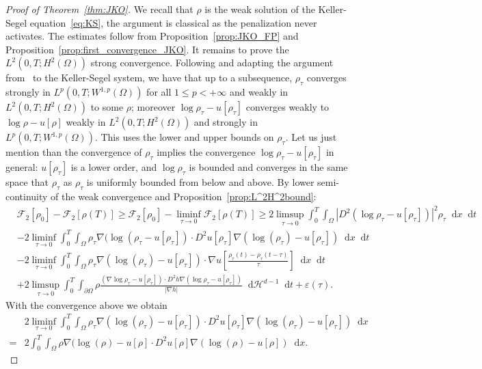 \documentclass[a4paper,twosided, 11pt]{article}
\renewcommand{\color}[2][]{}
\newcommand{\eps}{\varepsilon}
\newcommand {\f}   {\frac}
\newcommand {\p}   {\partial}
\theoremstyle{plain}
\theoremstyle{remark}
\newcommand{\diff}{\mathop{}\!\mathrm{d}}
\numberwithin{equation}{section}
\begin{document}
\begin{proof}[Proof of Theorem~\ref{thm:JKO}]
{\color{blue}We recall that $\rho$ is the weak solution of the Keller-Segel equation~\eqref{eq:KS}, the argument is classical as the penalization never activates. The estimates follow from Proposition~\ref{prop:JKO_FP} and Proposition~\ref{prop:first_convergence_JKO}. It remains to prove the $L^{2}(0,T; H^{2}(\Omega))$ strong convergence. Following and adapting the argument from~\cite[Theorem 6.5]{toshpulatov} to the Keller-Segel system, we have that up to a subsequence, $\rho_{\tau}$ converges strongly in $L^{p}(0,T; W^{1,p}(\Omega))$ for all $1\le p<+\infty$ and weakly in $L^{2}(0,T; H^{2}(\Omega))$ to some $\rho$; moreover $\log \rho_{\tau} -u[\rho_{\tau}]$ converges weakly to $\log \rho - u[\rho]$ weakly in $L^{2}(0,T; H^{2}(\Omega))$ and strongly in $L^{p}(0,T; W^{1,p}(\Omega))$. This uses the lower and upper bounds on $\rho_\tau$. Let us just mention than the convergence of $\rho_\tau$ implies the convergence $\log\rho_\tau - u[\rho_\tau]$ in general: $u[\rho_\tau]$ is a lower order, and $\log\rho_\tau$ is bounded and converges in the same space that $\rho_\tau$ as $\rho_\tau$ is uniformly bounded from below and above.}  By lower semi-continuity of the weak convergence and Proposition~\ref{prop:L^2H^2bound}:
\begin{align*}
 &\mathcal{F}_{2}[\rho_{0}] -  \mathcal{F}_{2}[\rho(T)]\ge \mathcal{F}_{2}[\rho_{0}] -  \liminf_{\tau\to 0}\mathcal{F}_{2}[\rho(T)] \ge 2\limsup_{\tau\to 0}\int_{0}^{T}\int_{\Omega} |D^{2}(\log \rho_{\tau}-u[\rho_{\tau}])|^2\rho_{\tau}\diff x \diff t \\
 &- 2\liminf_{\tau\to 0} \int_{0}^{T}\int_{\Omega}\rho_{\tau} \nabla(\log(\rho_{\tau} -u[\rho_{\tau}])\cdot D^{2}u[\rho_{\tau}]\nabla(\log(\rho_{\tau})-u[\rho_{\tau}])\diff x\diff t\\
 & - 2\liminf_{\tau\to 0} \int_{0}^{T}\int_{\Omega}\rho_{\tau}\nabla\left(\log(\rho_{\tau})-u[\rho_{\tau}]\right)\cdot \nabla u\left[\f{\rho_{\tau}(t)-\rho_{\tau}(t-\tau)}{\tau}\right]\diff x\diff t\\
 & +2\limsup_{\tau\to 0}\int_{0}^{T}\int_{\p\Omega}\rho \f{(\nabla \log \rho_{\tau}-u[\rho_{\tau}])\cdot D^{2} h \nabla (\log \rho_{\tau}-u[\rho_{\tau}])}{|\nabla h|}\diff \mathcal{H}^{d-1}\diff t + \eps(\tau). 
\end{align*}
With the convergence above we obtain 
\begin{align*}
&2\liminf_{\tau\to 0} \int_{0}^{T}\int_{\Omega}\rho_{\tau}  \nabla(\log(\rho_{\tau}) -u[\rho_{\tau}])\cdot D^{2}u[\rho_{\tau}]\nabla(\log(\rho_{\tau})-u[\rho_{\tau}]) \diff x\\
=&2 \int_{0}^{T}\int_{\Omega}\rho  \nabla(\log(\rho) -u[\rho]\cdot D^{2}u[\rho]\nabla(\log(\rho)-u[\rho])\diff x.
\end{align*}


\end{proof}
\end{document}
